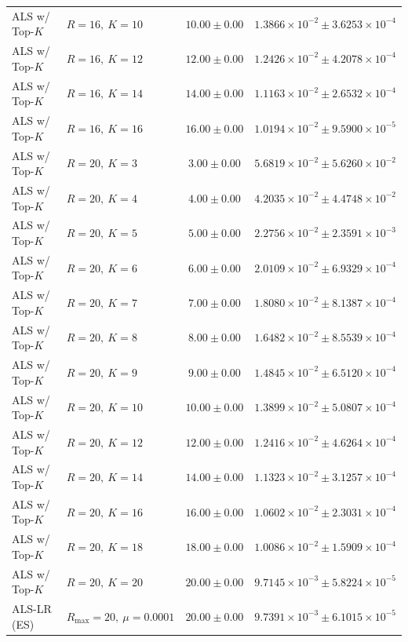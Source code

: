 \begin{table}[t]
\begin{tabular}{@{}llcc@{}}
ALS w/ Top-\(K\) & \(R=16,\ K=10\) & \(10.00 \pm 0.00\) & \(1.3866{\times}10^{-2} \pm 3.6253{\times}10^{-4}\) \\
ALS w/ Top-\(K\) & \(R=16,\ K=12\) & \(12.00 \pm 0.00\) & \(1.2426{\times}10^{-2} \pm 4.2078{\times}10^{-4}\) \\
ALS w/ Top-\(K\) & \(R=16,\ K=14\) & \(14.00 \pm 0.00\) & \(1.1163{\times}10^{-2} \pm 2.6532{\times}10^{-4}\) \\
ALS w/ Top-\(K\) & \(R=16,\ K=16\) & \(16.00 \pm 0.00\) & \(1.0194{\times}10^{-2} \pm 9.5900{\times}10^{-5}\) \\
ALS w/ Top-\(K\) & \(R=20,\ K=3\) & \(3.00 \pm 0.00\) & \(5.6819{\times}10^{-2} \pm 5.6260{\times}10^{-2}\) \\
ALS w/ Top-\(K\) & \(R=20,\ K=4\) & \(4.00 \pm 0.00\) & \(4.2035{\times}10^{-2} \pm 4.4748{\times}10^{-2}\) \\
ALS w/ Top-\(K\) & \(R=20,\ K=5\) & \(5.00 \pm 0.00\) & \(2.2756{\times}10^{-2} \pm 2.3591{\times}10^{-3}\) \\
ALS w/ Top-\(K\) & \(R=20,\ K=6\) & \(6.00 \pm 0.00\) & \(2.0109{\times}10^{-2} \pm 6.9329{\times}10^{-4}\) \\
ALS w/ Top-\(K\) & \(R=20,\ K=7\) & \(7.00 \pm 0.00\) & \(1.8080{\times}10^{-2} \pm 8.1387{\times}10^{-4}\) \\
ALS w/ Top-\(K\) & \(R=20,\ K=8\) & \(8.00 \pm 0.00\) & \(1.6482{\times}10^{-2} \pm 8.5539{\times}10^{-4}\) \\
ALS w/ Top-\(K\) & \(R=20,\ K=9\) & \(9.00 \pm 0.00\) & \(1.4845{\times}10^{-2} \pm 6.5120{\times}10^{-4}\) \\
ALS w/ Top-\(K\) & \(R=20,\ K=10\) & \(10.00 \pm 0.00\) & \(1.3899{\times}10^{-2} \pm 5.0807{\times}10^{-4}\) \\
ALS w/ Top-\(K\) & \(R=20,\ K=12\) & \(12.00 \pm 0.00\) & \(1.2416{\times}10^{-2} \pm 4.6264{\times}10^{-4}\) \\
ALS w/ Top-\(K\) & \(R=20,\ K=14\) & \(14.00 \pm 0.00\) & \(1.1323{\times}10^{-2} \pm 3.1257{\times}10^{-4}\) \\
ALS w/ Top-\(K\) & \(R=20,\ K=16\) & \(16.00 \pm 0.00\) & \(1.0602{\times}10^{-2} \pm 2.3031{\times}10^{-4}\) \\
ALS w/ Top-\(K\) & \(R=20,\ K=18\) & \(18.00 \pm 0.00\) & \(1.0086{\times}10^{-2} \pm 1.5909{\times}10^{-4}\) \\
ALS w/ Top-\(K\) & \(R=20,\ K=20\) & \(20.00 \pm 0.00\) & \(9.7145{\times}10^{-3} \pm 5.8224{\times}10^{-5}\) \\
ALS-LR (ES) & \(R_{\max}=20,\ \mu=0.0001\) & \(20.00 \pm 0.00\) & \(9.7391{\times}10^{-3} \pm 6.1015{\times}10^{-5}\) \\

\end{tabular}
\end{table}
